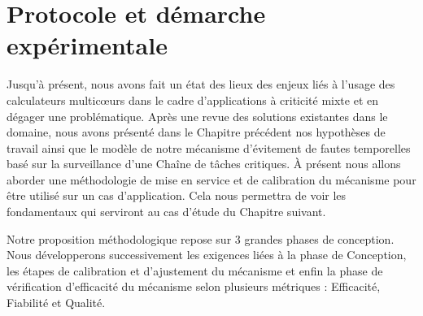 \documentclass[french, a4paper, 11pt, twoside, pdftex]{StyleThese}
\begin{document}
\setcounter{chapter}{3} %
\dominitoc
\faketableofcontents
\fi

\chapter{Protocole et démarche expérimentale} \label{chap:4_ProtocolExpe}
\minitoc

Jusqu'à présent, nous avons fait un état des lieux des enjeux liés à l'usage des calculateurs multicœurs dans le cadre d'applications à criticité mixte et en dégager une problématique. Après une revue des solutions existantes dans le domaine, nous avons présenté dans le Chapitre précédent nos hypothèses de travail ainsi que le modèle de notre mécanisme d'évitement de fautes temporelles basé sur la surveillance d'une Chaîne de tâches critiques. À présent nous allons aborder une méthodologie de mise en service et de calibration du mécanisme pour être utilisé sur un cas d'application. Cela nous permettra de voir les fondamentaux qui serviront au cas d'étude du Chapitre suivant. 

Notre proposition méthodologique repose sur 3 grandes phases de conception. Nous développerons successivement les exigences liées à la phase de Conception, les étapes de calibration et d'ajustement du mécanisme et enfin la phase de vérification d'efficacité du mécanisme selon plusieurs métriques : Efficacité, Fiabilité et Qualité. 
\end{document}
